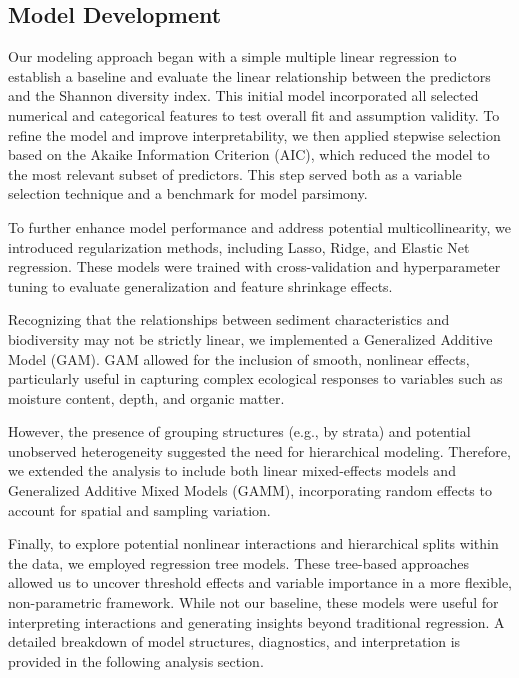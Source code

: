 \documentclass[12pt]{article}
\begin{document}
\subsection{Model Development}

\qquad Our modeling approach began with a simple multiple linear regression to
establish a baseline and evaluate the linear relationship between the predictors
and the Shannon diversity index. This initial model incorporated all selected
numerical and categorical features to test overall fit and assumption validity.
To refine the model and improve interpretability, we then applied stepwise
selection based on the Akaike Information Criterion (AIC), which reduced the
model to the most relevant subset of predictors. This step served both as a
variable selection technique and a benchmark for model parsimony.

\qquad To further enhance model performance and address potential
multicollinearity, we introduced regularization methods, including Lasso, Ridge,
and Elastic Net regression. These models were trained with cross-validation and
hyperparameter tuning to evaluate generalization and feature shrinkage effects.

\qquad Recognizing that the relationships between sediment characteristics and
biodiversity may not be strictly linear, we implemented a Generalized Additive
Model (GAM). GAM allowed for the inclusion of smooth, nonlinear effects,
particularly useful in capturing complex ecological responses to variables such
as moisture content, depth, and organic matter. 

\qquad However, the presence of grouping structures (e.g., by strata)
and potential unobserved heterogeneity suggested the need for hierarchical
modeling. Therefore, we extended the analysis to include both linear
mixed-effects models and Generalized Additive Mixed Models (GAMM), incorporating
random effects to account for spatial and sampling variation.

\qquad Finally, to explore potential nonlinear interactions and hierarchical
splits within the data, we employed regression tree models. These tree-based
approaches allowed us to uncover threshold effects and variable importance in a
more flexible, non-parametric framework. While not our baseline, these models
were useful for interpreting interactions and generating insights beyond
traditional regression. A detailed breakdown of model structures, diagnostics,
and interpretation is provided in the following analysis section.
\end{document}
